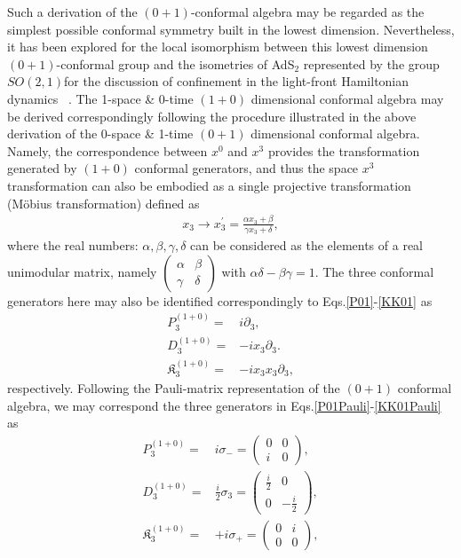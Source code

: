 \documentclass[%
 reprint,
superscriptaddress,
 amsmath,amssymb,
 aps,
]{revtex4-2}
\begin{document}
Such a derivation of the $(0+1)$-conformal algebra may be regarded as the simplest possible conformal symmetry built in the lowest dimension. Nevertheless, it has been explored for the local isomorphism between this lowest dimension $(0+1)$-conformal group and the isometries of AdS$_2$ represented by the group $SO(2, 1) $for the discussion of confinement in the light-front Hamiltonian dynamics~ \cite{Brodsky_2015}. The 1-space \& 0-time $(1+0)$ dimensional conformal algebra may be derived correspondingly following the procedure illustrated in the above derivation of the 0-space \& 1-time $(0+1)$ dimensional conformal algebra. Namely, the correspondence between $x^0$ and $x^3$ provides the transformation generated by $(1+0)$ conformal generators, and thus the space $x^3$ transformation can also be embodied as a single projective transformation (Möbius transformation) defined as
\begin{align}
    x_{3}\rightarrow x^{\prime}_{3}=\frac{\alpha x_{3} +\beta}{\gamma x_{3} +\delta},
\end{align}
where the real numbers: $\alpha, \beta, \gamma, \delta$ can be considered as the elements of a real unimodular matrix, namely $\begin{pmatrix}
    \alpha &   \beta \\
  \gamma & \delta
\end{pmatrix}$ with $\alpha\delta-\beta\gamma=1$. 
The three conformal generators here may also be identified 
correspondingly to Eqs.\eqref{P01}-\eqref{KK01} as 
\begin{align}
    P^{(1+0)}_{3}=&i\partial_{3},\label{P10}\\
    D^{(1+0)}_{3}=&-ix_{3}\partial_{3}.\label{D10}\\
    \mathfrak{K}^{(1+0)}_{{3}}=&-ix_{3}x_{3}\partial_{{3}},\label{KK10}
\end{align}
respectively. Following the Pauli-matrix representation of the $(0+1)$ conformal algebra, we may correspond the three generators in Eqs.\eqref{P01Pauli}-\eqref{KK01Pauli} as 
\begin{align}
    P^{(1+0)}_{3}=&i\sigma_{-}=\begin{pmatrix}
        0&0\\
        i&0
    \end{pmatrix},\label{P10Pauli}\\
    D^{(1+0)}_{3}=&\frac{i}{2}\sigma_{3}=\begin{pmatrix}
        \frac{i}{2}&0\\
        0&-\frac{i}{2}
    \end{pmatrix},\label{D10Pauli}\\
    \mathfrak{K}^{(1+0)}_{{3}}=&+i\sigma_{+}=\begin{pmatrix}
        0&i\\
        0&0
    \end{pmatrix},\label{KK10Pauli}
\end{align}
\end{document}
